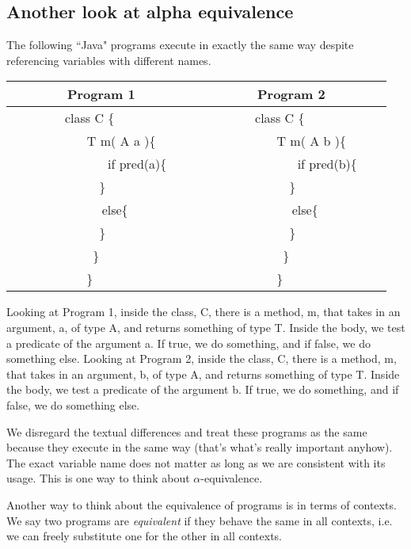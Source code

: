 \documentclass[12pt]{article}
\numberwithin{equation}{section}
\begin{document}
\subsection{Another look at alpha equivalence}
The following ``Java" programs execute in exactly the same way despite referencing variables with different names.
\begin{center}
\begin{tabular}{|c|c|}
\hline
Program 1                					&  	Program 2  						\\
\hline 													
class C \{	\ \ \						&	class C \{	\ \ \ 						\\
\ \ \ \ \ \ \ \ \ \  T m( A a )\{	 \ \ \		&	\ \ \ \ \ \ \ \ \ \  T m( A b )\{ \ \ \  		\\
\ \ \ \ \ \ \ \ \ \ \ \ \ \ \    if pred(a)\{ \ \ \	&	\ \ \ \ \ \ \ \ \ \ \ \ \ \ \   if pred(b)\{ \ \ \  	\\
\ \ \ \     \}		 \ \ \					&	\ \ \ \     \}      \ \ \          				\\
\ \ \ \ \ \ \ \      else\{	 \ \ \				&	\ \ \ \ \ \ \ \    else\{ \ \ \ 				\\
\ \ \ \     \}		 \ \ \ 					&	\ \ \ \     \} \ \ \ 						\\
\ \   \}		 \ \ \					&	 \ \ \} \ \ \							\\
\}		 \ \ \						&	\} \ \ \							\\
\hline
\end{tabular}
\end{center}
Looking at Program 1, inside the class, C, there is a method, m, that takes in an argument, a, of type A, and returns something of type T. Inside the body, we test a predicate of the argument a. If true, we do something, and if false, we do something else. Looking at Program 2, inside the class, C, there is a method, m, that takes in an argument, b, of type A, and returns something of type T. Inside the body, we test a predicate of the argument b. If true, we do something, and if false, we do something else.

We disregard the textual differences and treat these programs as the same because they execute in the same way (that's what's really important anyhow). The exact variable name does not matter as long as we are consistent with its usage. This is one way to think about $\alpha$-equivalence.

Another way to think about the equivalence of programs is in terms of contexts. We say two programs are \emph{equivalent} if they behave the same in all contexts, i.e. we can freely substitute one for the other in all contexts.
\end{document}
